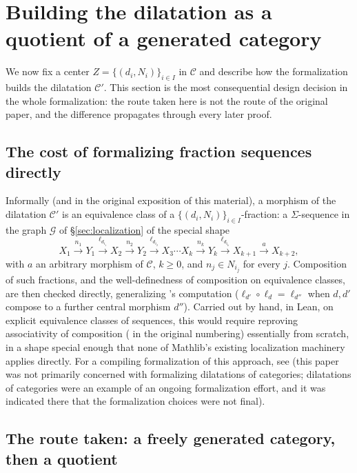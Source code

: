 \documentclass[11pt]{amsart}
\theoremstyle{plain}
\theoremstyle{definition}
\theoremstyle{remark}
\newcommand{\calC}{\mathcal C}
\begin{document}
\section{Building the dilatation as a quotient of a generated category}
\label{sec:dilatation-construction}

We now fix a center $Z = \{(d_i,N_i)\}_{i\in I}$ in $\calC$ and describe how the
formalization builds the dilatation $\calC'$. This section is the most consequential design
decision in the whole formalization: the route taken here is not the route of the original
paper, and the difference propagates through every later proof.

\subsection{The cost of formalizing fraction sequences directly}

Informally (and in the original exposition of this material), a morphism of the dilatation
$\calC'$ is an equivalence class of a $\{(d_i,N_i)\}_{i\in I}$-fraction: a
$\Sigma$-sequence in the graph $\mathcal G$ of \S\ref{sec:localization} of the special shape
\[
X_1 \xrightarrow{n_1} Y_1 \xrightarrow{\ell_{d_{i_1}}} X_2 \xrightarrow{n_2} Y_2
\xrightarrow{\ell_{d_{i_2}}} X_3 \cdots X_k \xrightarrow{n_k} Y_k
\xrightarrow{\ell_{d_{i_k}}} X_{k+1} \xrightarrow{a} X_{k+2},
\]
with $a$ an arbitrary morphism of $\calC$, $k \geq 0$, and $n_j \in N_{i_j}$ for every $j$.
Composition of such fractions, and the well-definedness of composition on equivalence
classes, are then checked directly, generalizing \citep[Fact~2.6]{Mayeux}'s computation
($\ell_{d'}\circ \ell_d = \ell_{d''}$ when $d,d'$ compose to a further central morphism
$d''$). Carried out by hand, in Lean, on explicit equivalence classes of sequences, this
would require reproving associativity of composition (\citep[Fact~2.11]{Mayeux} in the original numbering)
essentially from scratch, in a shape special enough that none of Mathlib's existing
localization machinery applies directly. For a compiling formalization of this approach, see \citep{MayDil} (this paper was not primarily concerned with formalizing dilatations of categories; dilatations of categories were an example of an ongoing formalization effort, and it was indicated there that the formalization choices were not final).

\subsection{The route taken: a freely generated category, then a quotient}
\end{document}
